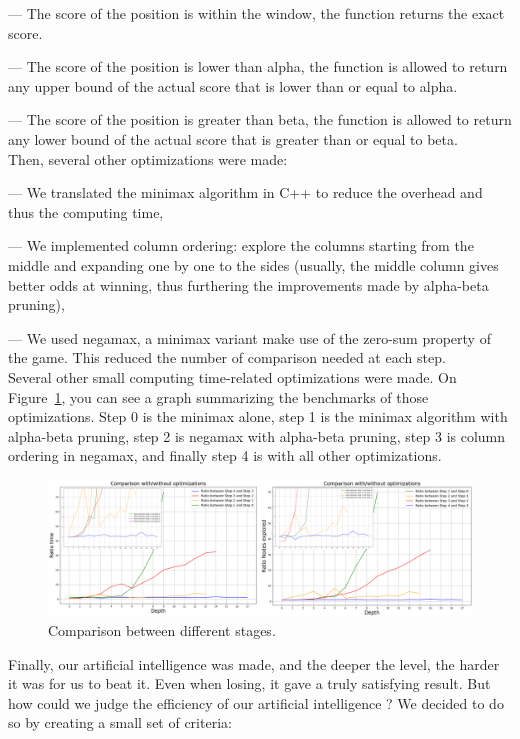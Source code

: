 \documentclass[11pt, a4paper, oneside]{report}
\begin{document}
	— The score of the position is within the window, the function returns the exact score.
	
	— The score of the position is lower than alpha, the function is allowed to return any upper bound of the actual score that is lower than or equal to alpha.

	— The score of the position is greater than beta, the function is allowed to return any lower bound of the actual score that is greater than or equal to beta. \\
	Then, several other optimizations were made:
	
	— We translated the minimax algorithm in C++ to reduce the overhead and thus the computing time,

	— We implemented column ordering: explore the columns starting from the middle and expanding one by one to the sides (usually, the middle column gives better odds at winning, thus furthering the improvements made by alpha-beta pruning),

	— We used negamax, a minimax variant make use of the zero-sum property of the game. This reduced the number of comparison needed at each step. \\

	Several other small computing time-related optimizations were made. On Figure~\ref{fig:ai_benchmarks}, you can see a graph summarizing the benchmarks of those optimizations. Step 0 is the minimax alone, step 1 is the minimax algorithm with alpha-beta pruning, step 2 is negamax with alpha-beta pruning, step 3 is column ordering in negamax, and finally step 4 is with all other optimizations. %
	\begin{figure}[ht]
		\includegraphics[scale=0.7]{Comparison_ai_stages.png}
		\centering
		\caption{Comparison between different stages.}\label{fig:ai_benchmarks}
	\end{figure}

	Finally, our artificial intelligence was made, and the deeper the level, the harder it was for us to beat it. Even when losing, it gave a truly satisfying result. But how could we judge the efficiency of our artificial intelligence ? We decided to do so by creating a small set of criteria:
\end{document}
